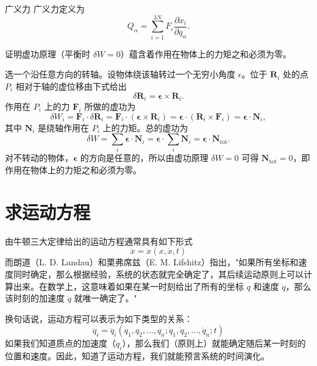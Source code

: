\begin{mydefinition}{广义力}
广义力定义为
\begin{equation}\label{eq:1.gf}
Q_\alpha = \sum_{i=1}^{3N}F_i\frac{\partial x_i}{\partial q_\alpha}.
\end{equation}
\end{mydefinition}

\begin{example}[虚功原理蕴含合力矩为零]
证明虚功原理（平衡时 $\delta W = 0$）蕴含着作用在物体上的力矩之和必须为零。
\end{example}

\begin{solution}
选一个沿任意方向的转轴。设物体绕该轴转过一个无穷小角度 $\epsilon$。位于 $\mathbf{R}_i$ 处的点 $P_i$ 相对于轴的虚位移由下式给出
\begin{equation*}
\delta\mathbf{R}_i = \bm{\epsilon}\times\mathbf{R}_i.
\end{equation*}
作用在 $P_i$ 上的力 $\mathbf{F}_i$ 所做的虚功为
\begin{equation*}
\delta W_i = \mathbf{F}_i\cdot\delta\mathbf{R}_i = \mathbf{F}_i\cdot(\bm{\epsilon}\times\mathbf{R}_i) = \bm{\epsilon}\cdot(\mathbf{R}_i\times\mathbf{F}_i) = \bm{\epsilon}\cdot\mathbf{N}_i,
\end{equation*}
其中 $\mathbf{N}_i$ 是绕轴作用在 $P_i$ 上的力矩。总的虚功为
\begin{equation*}
\delta W = \sum_i \bm{\epsilon}\cdot\mathbf{N}_i = \bm{\epsilon}\cdot\sum_i\mathbf{N}_i = \bm{\epsilon}\cdot\mathbf{N}_{\mathrm{tot}}.
\end{equation*}
对不转动的物体，$\bm{\epsilon}$ 的方向是任意的，所以由虚功原理 $\delta W = 0$ 可得 $\mathbf{N}_{\mathrm{tot}} = 0$，即作用在物体上的力矩之和必须为零。
\end{solution}

\section{求运动方程}
由牛顿三大定律给出的运动方程通常具有如下形式
\begin{equation}\label{eq:1.eom}
\ddot{x} = \ddot{x}(x, \dot{x}, t)
\end{equation}
而朗道（L. D. Landau）和栗弗席兹（E. M. Lifshitz）指出，"如果所有坐标和速度同时确定，那么根据经验，系统的状态就完全确定了，其后续运动原则上可以计算出来。在数学上，这意味着如果在某一时刻给出了所有的坐标 $q$ 和速度 $\dot{q}$，那么该时刻的加速度 $\ddot{q}$ 就唯一确定了。"

换句话说，运动方程可以表示为如下类型的关系：
\begin{equation}\label{eq:1.eom2}
\ddot{q}_i = \ddot{q}_i(q_1, q_2, \ldots, q_n; \dot{q}_1, \dot{q}_2, \ldots, \dot{q}_n; t)
\end{equation}
如果我们知道质点的加速度（$\ddot{q}_i$），那么我们（原则上）就能确定随后某一时刻的位置和速度。因此，知道了运动方程，我们就能预言系统的时间演化。

